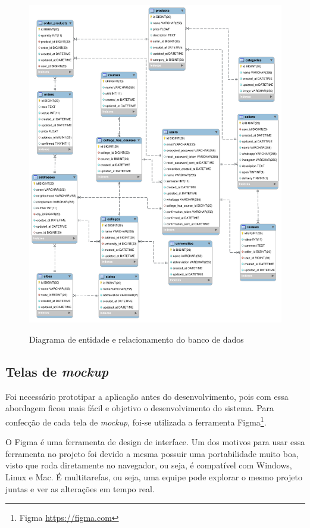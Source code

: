 \begin{figure}[htbp!]
  \centering
  \caption{Diagrama de entidade e relacionamento do banco de dados}
  \includegraphics[width=1\textwidth]{figs/err.png}
    \label{fig:err}
\end{figure}

\subsection{Telas de \textit{mockup}}\label{mockup}
Foi necessário prototipar a aplicação antes do desenvolvimento, pois com essa abordagem ficou mais fácil e objetivo o desenvolvimento do sistema. Para confecção de cada tela de \textit{mockup}, foi-se utilizada a ferramenta Figma\footnote{Figma \url{https://figma.com}}.

O Figma é uma ferramenta de design de interface. Um dos motivos para usar essa ferramenta no projeto foi devido a mesma possuir uma portabilidade muito boa, visto que roda diretamente no navegador, ou seja, é compatível com Windows, Linux e Mac. É multitarefas, ou seja, uma equipe pode explorar o mesmo projeto juntas e ver as alterações em tempo real.

